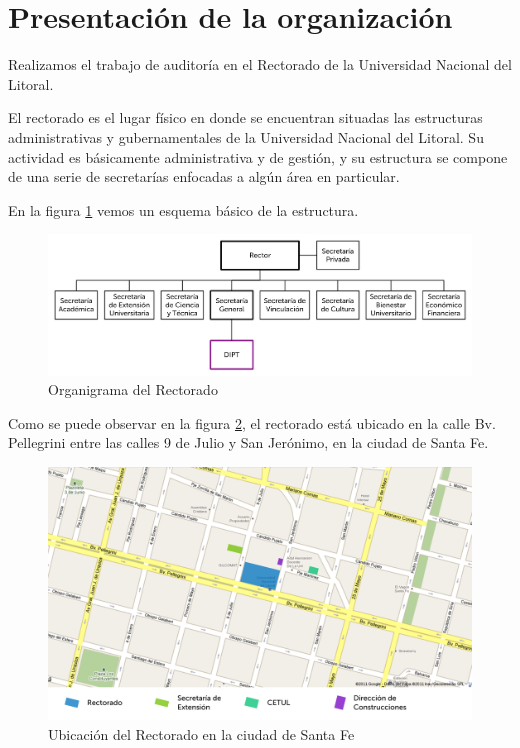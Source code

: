 \documentclass[a4paper,11pt,oneside]{article}
\begin{document}
%
\titlepage\maketitle
\newpage
\tableofcontents
\newpage
%
%
\section{Presentación de la organización}
%
Realizamos el trabajo de auditoría en el Rectorado de la Universidad
Nacional del Litoral.

El rectorado es el lugar físico en donde se encuentran situadas las
estructuras administrativas y gubernamentales de la Universidad
Nacional del Litoral.  Su actividad es básicamente administrativa y de
gestión, y su estructura se compone de una serie de secretarías
enfocadas a algún área en particular.

En la figura \ref{organi-rectorado} vemos un esquema básico de la estructura.
%
\begin{figure}[H]
  \center\includegraphics[width=\textwidth]{img/organi_rectorado}
  \caption{Organigrama del Rectorado}
  \label{organi-rectorado}
\end{figure}

Como se puede observar en la figura \ref{mapa-ubicación}, el rectorado
está ubicado en la calle Bv. Pellegrini entre las calles 9 de Julio y
San Jerónimo, en la ciudad de Santa Fe.

\begin{figure}[h]
  \center\includegraphics[width=\textwidth]{img/ubicacion_rect}
  \caption{Ubicación del Rectorado en la ciudad de Santa Fe}
  \label{mapa-ubicación}
\end{figure}
\end{document}
